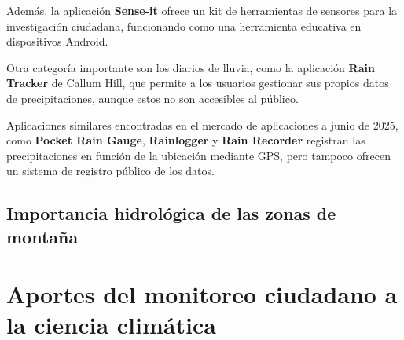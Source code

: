 Además, la aplicación \textbf{Sense-it} ofrece un kit de herramientas de sensores para la investigación ciudadana, funcionando como una herramienta educativa en dispositivos Android.\cite{van2017senseit}


Otra categoría importante son los diarios de lluvia, como la aplicación \textbf{Rain Tracker} de Callum Hill, que permite a los usuarios gestionar sus propios datos de precipitaciones, aunque estos no son accesibles al público. \cite{hill2021raintracker}

Aplicaciones similares encontradas en el mercado de aplicaciones a junio de 2025, como \textbf{Pocket Rain Gauge}, \textbf{Rainlogger} y \textbf{Rain Recorder} registran las precipitaciones en función de la ubicación mediante GPS, pero tampoco ofrecen un sistema de registro público de los datos.


\subsection{Importancia hidrológica de las zonas de montaña}


\section{Aportes del monitoreo ciudadano a la ciencia climática}







